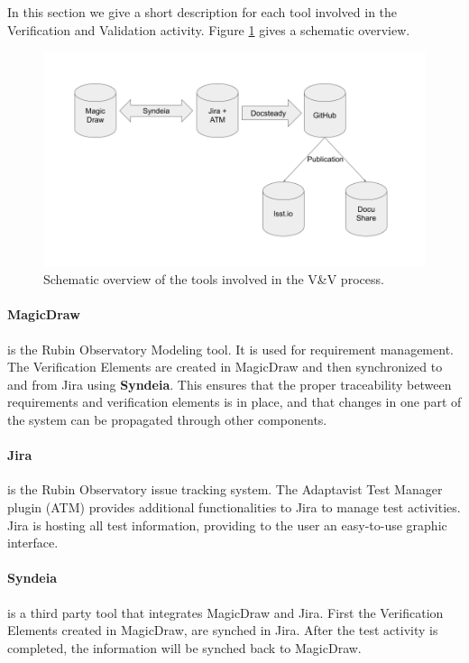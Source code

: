 In this section we give a short description for each tool involved in the Verification and Validation activity.
Figure \ref{fig:vandvtools} gives a schematic overview.

\begin{figure}
\begin{center}
\includegraphics[width=\textwidth]{imgs/VandVtools.png}
 \caption{Schematic overview of the tools involved in the V\&V process.}
 \label{fig:vandvtools}
\end{center}
\end{figure}

\paragraph{MagicDraw}
is the Rubin Observatory Modeling tool. It is used for requirement management. The Verification Elements are created
in MagicDraw and then synchronized to and from Jira using \textbf{Syndeia}. This ensures that the proper 
traceability between requirements and verification elements is in place, and that changes in one part of the system can be propagated through other components.

\paragraph{Jira}
is the Rubin Observatory issue tracking system.
The Adaptavist Test Manager plugin (ATM) provides additional functionalities to Jira to manage test activities.
Jira is hosting all test information, providing to the user an easy-to-use graphic interface.

\paragraph{Syndeia}
is a third party tool that integrates MagicDraw and Jira. First the Verification Elements created in MagicDraw,
are synched in Jira. After the test activity is completed, the information will be synched back to MagicDraw.

